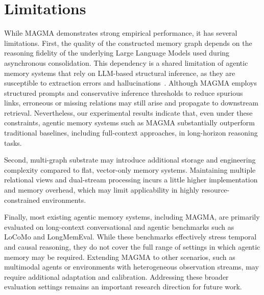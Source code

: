 \documentclass[11pt]{article}
\begin{document}



\section{Limitations}
\label{sec:limitations}

While MAGMA demonstrates strong empirical performance, it has several limitations. First, the quality of the constructed memory graph depends on the reasoning fidelity of the underlying Large Language Models used during asynchronous consolidation. This dependency is a shared limitation of agentic memory systems that rely on LLM-based structural inference, as they are susceptible to extraction errors and hallucinations~\citep{pan2024unifying, xi2025rise, wadhwa2023revisiting}. Although MAGMA employs structured prompts and conservative inference thresholds to reduce spurious links, erroneous or missing relations may still arise and propagate to downstream retrieval. Nevertheless, our experimental results indicate that, even under these constraints, agentic memory systems such as MAGMA substantially outperform traditional baselines, including full-context approaches, in long-horizon reasoning tasks.

Second, multi-graph substrate may introduce additional storage and engineering complexity compared to flat, vector-only memory systems. Maintaining multiple relational views and dual-stream processing incurs a little higher implementation and memory overhead, which may limit applicability in highly resource-constrained environments.

Finally, most existing agentic memory systems, including MAGMA, are primarily evaluated on long-context conversational and agentic benchmarks such as LoCoMo and LongMemEval. While these benchmarks effectively stress temporal and causal reasoning, they do not cover the full range of settings in which agentic memory may be required\citep{hu2025memory, jiang2026anatomy}. Extending MAGMA to other scenarios, such as multimodal agents or environments with heterogeneous observation streams, may require additional adaptation and calibration. Addressing these broader evaluation settings remains an important research direction for future work.
\end{document}
